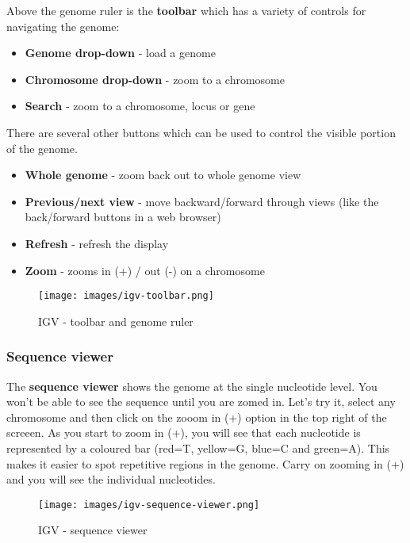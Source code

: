 \documentclass[11pt]{article}
\providecommand{\tightlist}{%
      \setlength{\itemsep}{0pt}\setlength{\parskip}{0pt}}
\begin{document}
Above the genome ruler is the \textbf{toolbar} which has a variety of
controls for navigating the genome:

\begin{itemize}
\tightlist
\item
  \textbf{Genome drop-down} - load a genome
\item
  \textbf{Chromosome drop-down} - zoom to a chromosome
\item
  \textbf{Search} - zoom to a chromosome, locus or gene
\end{itemize}

There are several other buttons which can be used to control the visible
portion of the genome.

\begin{itemize}
\tightlist
\item
  \textbf{Whole genome} - zoom back out to whole genome view
\item
  \textbf{Previous/next view} - move backward/forward through views
  (like the back/forward buttons in a web browser)
\item
  \textbf{Refresh} - refresh the display
\item
  \textbf{Zoom} - zooms in (+) / out (-) on a chromosome
\end{itemize}

    \begin{figure}
\centering
\texttt{[image: images/igv-toolbar.png]}
\caption{IGV - toolbar and genome ruler}
\end{figure}

    \hypertarget{sequence-viewer}{%
\subsubsection{Sequence viewer}\label{sequence-viewer}}

The \textbf{sequence viewer} shows the genome at the single nucleotide
level. You won't be able to see the sequence until you are zomed in.
Let's try it, select any chromosome and then click on the zooom in (+) 
option in the top right of the screeen. As you start to zoom in (+), 
you will see that each nucleotide is represented by a coloured bar 
(red=T, yellow=G, blue=C and green=A). This makes it easier to spot 
repetitive regions in the genome. Carry on zooming in (+) and you will 
see the individual nucleotides.

    \begin{figure}
\centering
\texttt{[image: images/igv-sequence-viewer.png]}
\caption{IGV - sequence viewer}
\end{figure}
\end{document}
